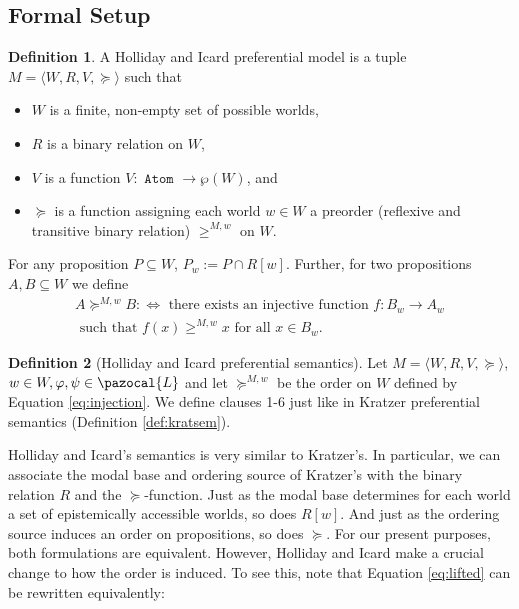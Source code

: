 \documentclass{article}
\theoremstyle{definition}
\newtheorem{definition}{Definition}
\renewcommand{\L}{\pazocal{L}}
\begin{document}
\subsection{Formal Setup}
\begin{definition}
    A Holliday and Icard preferential model is a tuple $M = {\langle
      W,R,V,\succeq\rangle}$ such that
    \begin{itemize}[nosep]
        \renewcommand\labelitemi{--}
      \item $W$ is a finite, non-empty set of possible worlds,
      \item $R$ is a binary relation on $W$,
      \item $V$ is a function $V: \texttt{ Atom } \rightarrow \wp(W)$, and
      \item $\succeq$ is a function assigning each world $w \in W$ a preorder
        (reflexive and transitive binary relation) $\geq^{M,w}$ on $W$. 
    \end{itemize}
\end{definition}
For any proposition $P \subseteq W$, $P_w := P \cap R[w]$. Further, for two propositions $A,B \subseteq W$ we define
\begin{multline}
    \label{eq:injection}A \succeq^{M,w} B :\iff \text{ there exists an injective function } f: B_w \rightarrow A_w \\ \text{ such that } f(x) \geq^{M,w} x \text{ for all } x \in B_w.
\end{multline}

\begin{definition}[Holliday and Icard preferential semantics] Let $M = {\langle
      W,R,V,\succeq \rangle}$, $w \in W, \varphi,\psi \in \L$ and let $\succeq^{M,w}$ be the order on $W$ defined by Equation \ref{eq:injection}. We define clauses 1-6 just like in Kratzer preferential semantics (Definition \ref{def:kratsem}).
\end{definition}

Holliday and Icard's semantics is very similar to Kratzer's.
In particular, we can associate the modal base and ordering source of Kratzer's with the binary relation $R$ and the $\succeq$-function.
Just as the modal base determines for each world a set of epistemically accessible worlds, so does $R[w]$.
And just as the ordering source induces an order on propositions, so does $\succeq$.
For our present purposes, both formulations are equivalent.
However, Holliday and Icard make a crucial change to how the order is induced.
To see this, note that Equation \ref{eq:lifted} can be rewritten equivalently:
\end{document}

